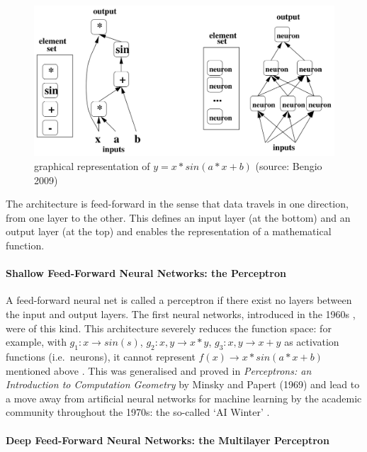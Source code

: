 \documentclass[a4paper,11pt]{article}
\begin{document}
\begin{figure}[h!]
	\centering
	\includegraphics[scale=0.3]{images/NN_math_rep.png}
	\caption{graphical representation of $y = x*sin(a*x+b)$ (source: Bengio 2009)}
\end{figure}

The architecture is feed-forward in the sense that data travels in one direction, from one layer to the other. This defines an input layer (at the bottom) and an output layer (at the top) and enables the representation of a mathematical function.

\paragraph{Shallow Feed-Forward Neural Networks: the Perceptron} 

A feed-forward neural net is called a perceptron if there exist no layers between the input and output layers. The first neural networks, introduced in the 1960s \cite{DL-book}, were of this kind. This architecture severely reduces the function space: for example, with $g_{1}: x \rightarrow sin(s)$, $g_{2}: x,y \rightarrow x*y$, $g_{3}: x,y \rightarrow x+y$ as activation functions (i.e.\ neurons), it cannot represent $f(x) \rightarrow x*sin(a*x+b)$ mentioned above \cite{DL-book}. This was generalised and proved in \textit{Perceptrons: an Introduction to Computation Geometry} by Minsky and Papert (1969) and lead to a move away from artificial neural networks for machine learning by the academic community throughout the 1970s: the so-called `AI Winter' \cite{Russel & Norvig}. 

\paragraph{Deep Feed-Forward Neural Networks: the Multilayer Perceptron} 
\end{document}
